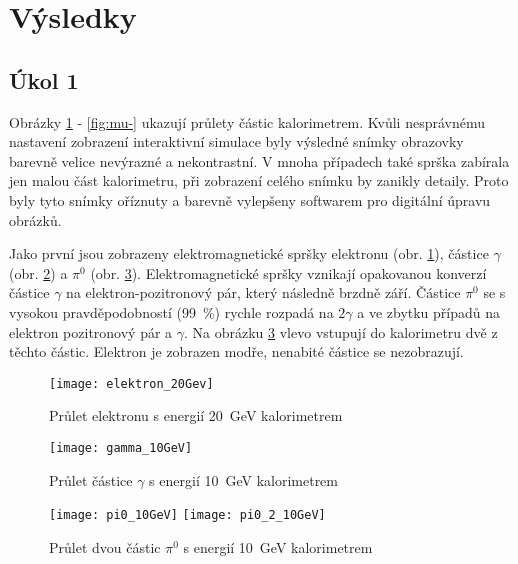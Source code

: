 \documentclass{protokol}
\begin{document}
    
  \section*{Výsledky}

    \subsection*{Úkol 1}

      Obrázky \ref{fig:elektron_20Gev} - \ref{fig:mu-} ukazují průlety částic kalorimetrem. Kvůli nesprávnému nastavení zobrazení interaktivní simulace byly výsledné snímky obrazovky barevně velice nevýrazné a nekontrastní. V mnoha případech také sprška zabírala jen malou část kalorimetru, při zobrazení celého snímku by zanikly detaily. Proto byly tyto snímky oříznuty a barevně vylepšeny softwarem pro digitální úpravu obrázků. 

      Jako první jsou zobrazeny elektromagnetické spršky elektronu (obr. \ref{fig:elektron_20Gev}), částice $\gamma$ (obr. \ref{fig:gamma_10GeV}) a $\pi^0$ (obr. \ref{fig:pi0_10GeV}). Elektromagnetické spršky vznikají opakovanou konverzí částice $\gamma$ na elektron-pozitronový pár, který následně brzdně září. Částice $\pi^0$ se s vysokou pravděpodobností (\SI{99}{\percent}) rychle rozpadá na $2 \gamma$ a ve zbytku případů na elektron pozitronový pár a $\gamma$. Na obrázku \ref{fig:pi0_10GeV} vlevo vstupují do kalorimetru dvě z těchto částic. Elektron je zobrazen modře, nenabité částice se nezobrazují.

    \begin{figure}[H]
      \centering
      \texttt{[image: elektron\_20Gev]}
      \vspace{-10pt}
      \caption{Průlet elektronu s energií \SI{20}{GeV} kalorimetrem}
      \label{fig:elektron_20Gev}
    \end{figure}

    \vspace{-10pt}

    \begin{figure}[H]
      \centering
      \texttt{[image: gamma\_10GeV]}
      \vspace{-10pt}
      \caption{Průlet částice $\gamma$ s energií \SI{10}{GeV} kalorimetrem}
      \label{fig:gamma_10GeV}
    \end{figure} 

    \vspace{-10pt}

    \begin{figure}[H]
      \centering
      \texttt{[image: pi0\_10GeV]}
      \texttt{[image: pi0\_2\_10GeV]}
      \vspace{-10pt}
      \caption{Průlet dvou částic $\pi^0$ s energií \SI{10}{GeV} kalorimetrem}
      \label{fig:pi0_10GeV}
    \end{figure}
\end{document}
